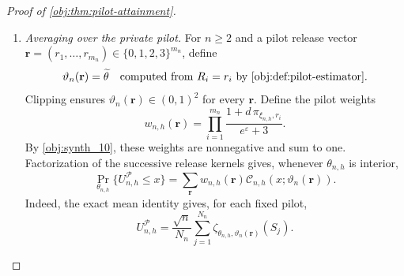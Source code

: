 \begin{proof}[Proof of \cref{obj:thm:pilot-attainment}]
\begin{enumerate}
Take any strictly increasing sequence of integers \(n_k\ge2\) and any interior sequence \(\vartheta_k\to\theta\). Under the corresponding row law, put
\[
Z_{k,j}=\zeta_{\xi_{n_k,h},\vartheta_k}(S_j),
\qquad 1\le j\le N_{n_k},
\]
and
\[
\mathcal D_k(y)
=
\mathbb P^{\mathrm{row}}_{n_k,h,\vartheta_k}
\left\{
N_{n_k}^{-1/2}\sum_{j=1}^{N_{n_k}}Z_{k,j}\le y
\right\},
\qquad y\in\mathbb R.
\]
The rows are independent, centered, and bounded by \(2\overline\phi\), and their single-release variances satisfy
\[
\mathbb E^{\mathrm{row}}[Z_{k,1}^2]
=\sigma^2(\xi_{n_k,h},\vartheta_k)
\longrightarrow V^*(\theta,p,\varepsilon)>0.
\]
The increments normalized by
\(\sqrt{N_{n_k}V^*(\theta,p,\varepsilon)}\) therefore satisfy
\[
\sum_{j=1}^{N_{n_k}}
\mathbb E^{\mathrm{row}}
\left[
\left(\frac{Z_{k,j}}
{\sqrt{N_{n_k}V^*(\theta,p,\varepsilon)}}\right)^2
\right]
=
\frac{\sigma^2(\xi_{n_k,h},\vartheta_k)}
{V^*(\theta,p,\varepsilon)}
\longrightarrow1,
\]
and
\[
\sum_{j=1}^{N_{n_k}}
\mathbb E^{\mathrm{row}}
\left[
\left|\frac{Z_{k,j}}
{\sqrt{N_{n_k}V^*(\theta,p,\varepsilon)}}\right|^4
\right]
\le
\frac{(2\overline\phi)^4}
{N_{n_k}\{V^*(\theta,p,\varepsilon)\}^2}
\longrightarrow0.
\]
The triangular-array Lyapunov central limit theorem consequently gives
\[
\mathcal D_k(y)\longrightarrow\mathcal G_\theta(y)
\qquad(y\in\mathbb R).
\]

Define
\[
\lambda_k=\sqrt{\frac{n_k}{N_{n_k}}},
\qquad
\chi_k=\frac{x}{\lambda_k}.
\]
Then \(\lambda_k\to1\), \(\chi_k\to x\), and
\[
\mathcal C_{n_k,h}(x;\vartheta_k)=\mathcal D_k(\chi_k).
\]
For every \(a>0\), eventually
\[
\mathcal D_k(x-a)\le\mathcal D_k(\chi_k)\le\mathcal D_k(x+a).
\]
Pointwise convergence and continuity of \(\mathcal G_\theta\), followed by \(a\downarrow0\), prove
\[
\mathcal C_{n_k,h}(x;\vartheta_k)\longrightarrow\mathcal G_\theta(x).
\]

\item \emph{Averaging over the private pilot.}
For \(n\ge2\) and a pilot release vector
\(\mathbf r=(r_1,\ldots,r_{m_n})\in\{0,1,2,3\}^{m_n}\), define
\[
\vartheta_n(\mathbf r)
=\widetilde\theta
\quad\text{computed from }R_i=r_i
\text{ by }\cref{obj:def:pilot-estimator}.
\]
Clipping ensures \(\vartheta_n(\mathbf r)\in(0,1)^2\) for every \(\mathbf r\). Define the pilot weights
\[
w_{n,h}(\mathbf r)
=
\prod_{i=1}^{m_n}
\frac{1+d\,\pi_{\xi_{n,h},r_i}}{e^\varepsilon+3}.
\]
By \cref{obj:synth_10}, these weights are nonnegative and sum to one. Factorization of the successive release kernels gives, whenever \(\theta_{n,h}\) is interior,
\[
\Pr_{\theta_{n,h}}\{U_{n,h}^{\mathcal P}\le x\}
=
\sum_{\mathbf r}w_{n,h}(\mathbf r)
\mathcal C_{n,h}(x;\vartheta_n(\mathbf r)).
\]
Indeed, the exact mean identity gives, for each fixed pilot,
\[
U_{n,h}^{\mathcal P}
=
\frac{\sqrt n}{N_n}
\sum_{j=1}^{N_n}
\zeta_{\theta_{n,h},\vartheta_n(\mathbf r)}(S_j).
\]


\end{enumerate}
\end{proof}
